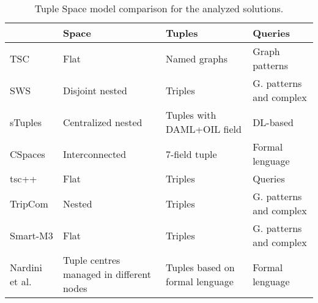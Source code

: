 

\begin{table}[htbp]
\caption{Tuple Space model comparison for the analyzed solutions.}

\begin{tabular}{ l p{3cm} p{3cm} p{3cm} }
\hline 
  & Space  & Tuples  & Queries \tabularnewline
\hline 
 TSC & Flat  & Named graphs  & Graph patterns \tabularnewline
 SWS & Disjoint nested  & Triples  & G. patterns and complex \tabularnewline
 sTuples & Centralized nested  & Tuples with DAML+OIL field  & DL-based \tabularnewline
 CSpaces & Interconnected  & 7-field tuple  & Formal lenguage \tabularnewline
 tsc++ & Flat  & Triples  & Queries \tabularnewline
 TripCom & Nested  & Triples  & G. patterns and complex \tabularnewline
 Smart-M3 & Flat  & Triples  & G. patterns and complex \tabularnewline
 Nardini et al. & Tuple centres managed in different nodes & Tuples based on formal lenguage  & Formal lenguage \tabularnewline
\hline 
\end{tabular}
\label{tab:comparisonTS}
\end{table}